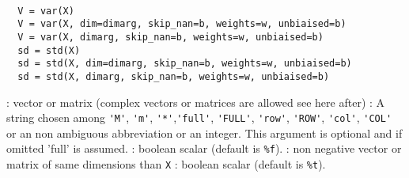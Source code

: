 
\begin{mandesc}
   \\
\end{mandesc}

\begin{calling_sequence}
\begin{verbatim}
  V = var(X)
  V = var(X, dim=dimarg, skip_nan=b, weights=w, unbiaised=b)  
  V = var(X, dimarg, skip_nan=b, weights=w, unbiaised=b)  
  sd = std(X)
  sd = std(X, dim=dimarg, skip_nan=b, weights=w, unbiaised=b)  
  sd = std(X, dimarg, skip_nan=b, weights=w, unbiaised=b)  
\end{verbatim}
\end{calling_sequence}
\begin{parameters}
  \begin{varlist}
    : vector or matrix (complex vectors or matrices are allowed see here after)
    : A string chosen among \verb+'M'+, \verb+'m'+, \verb+'*'+,\verb+'full'+, \verb+'FULL'+, \verb+'row'+,
    \verb+'ROW'+, \verb+'col'+, \verb+'COL'+ or an non ambiguous abbreviation or an integer. 
    This argument is optional and if omitted 'full' is assumed.
    : boolean scalar (default is \verb+%f+).
    : non negative vector or matrix of same dimensions than \verb+X+ 
    :  boolean scalar (default is \verb+%t+).
  \end{varlist}
\end{parameters}

